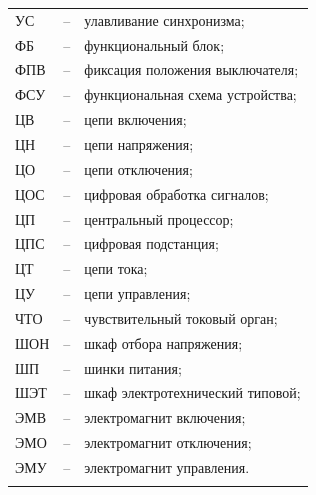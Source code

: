 \begin{longtable}{>{\raggedright\arraybackslash}m{2cm}>{\raggedright\arraybackslash}m{0.5cm}>{\raggedright\arraybackslash}m{20cm}}
УС & -- & улавливание синхронизма; \\
ФБ & -- & функциональный блок; \\
ФПВ & -- & фиксация положения выключателя; \\
ФСУ & -- & функциональная схема устройства; \\
ЦВ & -- & цепи включения; \\
ЦН & -- & цепи напряжения; \\
ЦО & -- & цепи отключения; \\
ЦОС & -- & цифровая обработка сигналов; \\
ЦП & -- & центральный процессор; \\
ЦПС & -- & цифровая подстанция; \\
ЦТ & -- & цепи тока; \\
ЦУ & -- & цепи управления; \\
ЧТО & -- & чувствительный токовый орган; \\
ШОН & -- & шкаф отбора напряжения; \\
ШП & -- & шинки питания; \\
ШЭТ & -- & шкаф электротехнический типовой; \\
ЭМВ & -- & электромагнит включения; \\
ЭМО & -- & электромагнит отключения; \\
ЭМУ & -- & электромагнит управления. \\
{\color{white}\fontsize{0.1pt}{0.1pt}\selectfont<endABBRS>}
\end{longtable}
